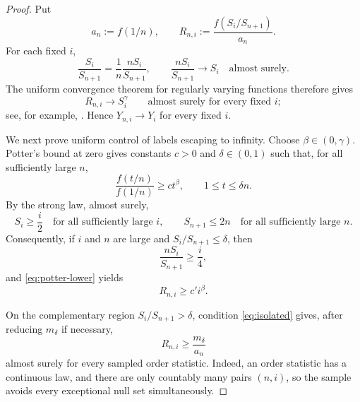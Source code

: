 \documentclass[11pt]{article}
\numberwithin{equation}{section}
\theoremstyle{definition}
\theoremstyle{remark}
\begin{document}
\begin{proof}
Put
\[
  a_n:=f(1/n),
  \qquad
  R_{n,i}:=\frac{f(S_i/S_{n+1})}{a_n}.
\]
For each fixed $i$,
\[
  \frac{S_i}{S_{n+1}}
  =\frac1n\frac{nS_i}{S_{n+1}},
  \qquad
  \frac{nS_i}{S_{n+1}}\longrightarrow S_i
  \quad\text{almost surely}.
\]
The uniform convergence theorem for regularly varying functions therefore gives
\begin{equation}
  R_{n,i}\longrightarrow S_i^\gamma
  \qquad\text{almost surely for every fixed }i;
  \label{eq:fixed-coordinate-rates}
\end{equation}
see, for example, \cite[Theorem~1.2.1]{BGT}.  Hence $Y_{n,i}\to Y_i$ for every fixed $i$.

We next prove uniform control of labels escaping to infinity.  Choose $\beta\in(0,\gamma)$.  Potter's bound at zero \cite[Theorem~1.5.6]{BGT} gives constants $c>0$ and $\delta\in(0,1)$ such that, for all sufficiently large $n$,
\begin{equation}
  \frac{f(t/n)}{f(1/n)}\geq c t^\beta,
  \qquad 1\leq t\leq \delta n.
  \label{eq:potter-lower}
\end{equation}
By the strong law, almost surely,
\begin{equation}
  S_i\geq \frac{i}{2}\quad\text{for all sufficiently large }i,
  \qquad
  S_{n+1}\leq2n\quad\text{for all sufficiently large }n.
  \label{eq:slln-S}
\end{equation}
Consequently, if $i$ and $n$ are large and $S_i/S_{n+1}\leq\delta$, then
\[
  \frac{nS_i}{S_{n+1}}\geq\frac{i}{4},
\]
and \eqref{eq:potter-lower} yields
\begin{equation}
  R_{n,i}\geq c' i^\beta.
  \label{eq:endpoint-rate-lower}
\end{equation}

On the complementary region $S_i/S_{n+1}>\delta$, condition \eqref{eq:isolated} gives, after reducing $m_\delta$ if necessary,
\begin{equation}
  R_{n,i}\geq \frac{m_\delta}{a_n}
  \label{eq:interior-rate-lower}
\end{equation}
almost surely for every sampled order statistic.  Indeed, an order statistic has a continuous law, and there are only countably many pairs $(n,i)$, so the sample avoids every exceptional null set simultaneously.


\end{proof}
\end{document}
